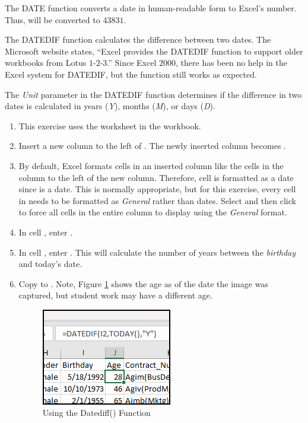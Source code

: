 The DATE function converts a date in human-readable form to Excel's number. Thus,  will be converted to $ 43831 $.

The DATEDIF function calculates the difference between two dates. The Microsoft website states, ``Excel provides the DATEDIF function to support older workbooks from Lotus $ 1 $-$ 2 $-$ 3 $.'' Since Excel $ 2000 $, there has been no help in the Excel system for DATEDIF, but the function still works as expected. 

The \textit{Unit} parameter in the DATEDIF function determines if the difference in two dates is calculated in years (\textit{Y}), months (\textit{M}), or days (\textit{D}).

\begin{enumbox}
	\begin{enumerate}
		\item This exercise uses the  worksheet in the  workbook.
		\item Insert a new column to the left of . The newly inserted column becomes .
		\item By default, Excel formats cells in an inserted column like the cells in the column to the left of the new column. Therefore, cell  is formatted as a date since  is a date. This is normally appropriate, but for this exercise, every cell in  needs to be formatted as \textit{General} rather than dates. Select  and then click  to force all cells in the entire column to display using the \textit{General} format.
		\item In cell , enter .
		\item In cell , enter . This will calculate the number of years between the \textit{birthday} and today's date. 
		\item Copy  to . Note, Figure \ref{09:fig46} shows the age as of the date the image was captured, but student work may have a different age.
		
		\begin{figure}[H]
			\centering
			\includegraphics[width=\maxwidth{.50\linewidth}]{gfx/ch09_fig46}
			\caption{Using the Datediff() Function}
			\label{09:fig46}
		\end{figure}
		

\end{enumerate}
\end{enumbox}
